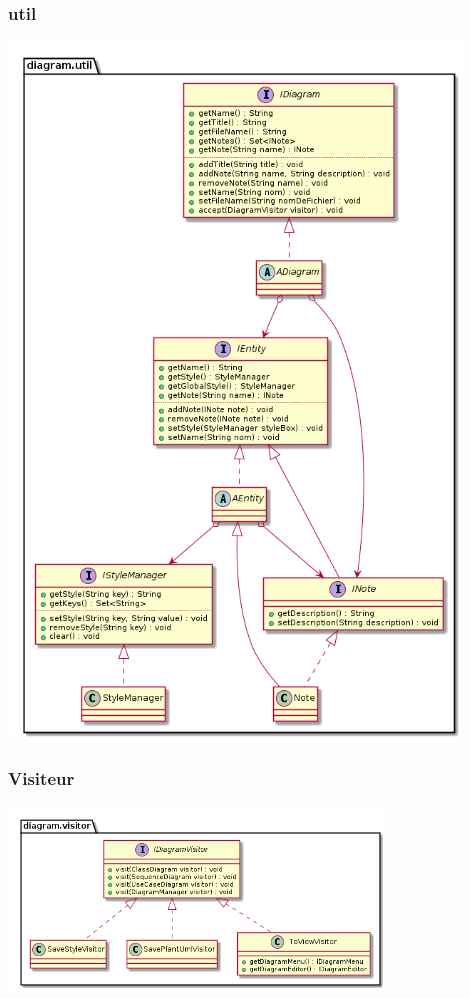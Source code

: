 \documentclass[a4paper,10pt]{article}
\begin{document}
	\subsubsection{util}
	\begin{center}
	  \includegraphics[width=12cm]{Image/util.png}
	\end{center}
	\subsubsection{Visiteur}
	\begin{center}
	  \includegraphics[width=10cm]{Image/visiteurGlobaux.png}
	\end{center}
	
\end{document}
